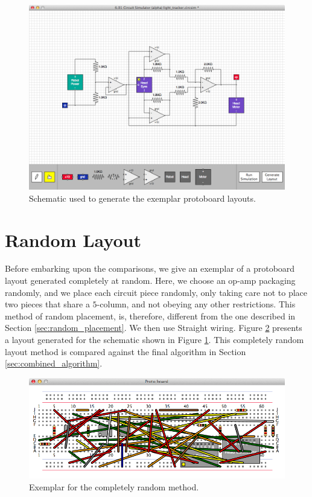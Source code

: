 \begin{figure}
\begin{center}
\includegraphics[width=\textwidth]{Images/exemplar_schematic.png}
\caption[Exemplar schematic]{Schematic used to generate the exemplar protoboard
layouts.}
\label{fig:exemplar_schematic}
\end{center}
\end{figure}

\section{Random Layout}

Before embarking upon the comparisons, we give an exemplar of a protoboard
layout generated completely at random. Here, we choose an op-amp packaging
randomly, and we place each circuit piece randomly,
only taking care not to place two pieces that share a $5$-column, and
not obeying any other restrictions. This method of random placement, is,
therefore, different from the one described in Section
\ref{sec:random_placement}. We then use Straight wiring. Figure
\ref{fig:completely_random} presents a layout generated for the schematic
shown in Figure \ref{fig:exemplar_schematic}. This completely random layout
method is compared against the final algorithm in Section
\ref{sec:combined_algorithm}.

\begin{figure}[H]
\begin{center}
\includegraphics[width=\textwidth]{Images/exemplar_completely_random.png}
\caption[Random layout exemplar]{Exemplar for the completely random method.}
\label{fig:completely_random}
\end{center}
\end{figure}

